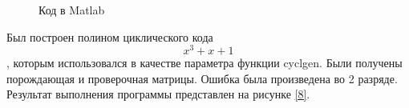 \documentclass[a4paper,14pt]{extarticle}
\begin{document}
\begin{figure}[H]
\caption{Код в Matlab}
\label{7}
\end{figure}

Был построен полином циклического кода \begin{equation} x^3 + x + 1 \end{equation}, которым использовался в качестве параметра функции cyclgen.
Были получены порождающая и проверочная матрицы. Ошибка была произведена во 2 разряде.
Результат выполнения программы представлен на рисунке \ref{8}.
\end{document}
